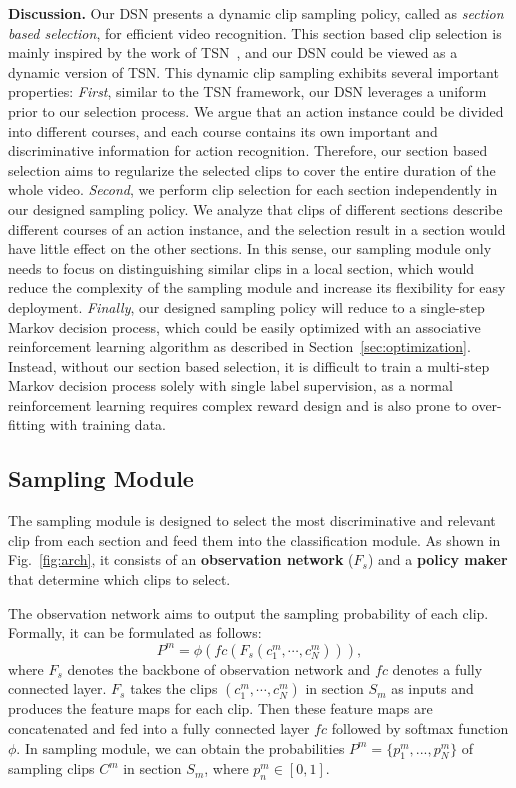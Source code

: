 \documentclass[journal]{IEEEtran}
\begin{document}
{\bf Discussion.} Our DSN presents a dynamic clip sampling policy, called as {\em section based selection}, for efficient video recognition. This section based clip selection is mainly inspired by the work of TSN~\cite{TSN-J}, and our DSN could be viewed as a dynamic version of TSN. This dynamic clip sampling exhibits several important properties: {\em First}, similar to the TSN framework, our DSN leverages a uniform prior to our selection process. We argue that an action instance could be divided into different courses, and each course contains its own important and discriminative information for action recognition. Therefore, our section based selection aims to regularize the selected clips to cover the entire duration of the whole video. {\em Second}, we perform clip selection for each section independently in our designed sampling policy. We analyze that clips of different sections describe different courses of an action instance, and the selection result in a section would have little effect on the other sections. In this sense, our sampling module only needs to focus on distinguishing similar clips in a local section, which would reduce the complexity of the sampling module and increase its flexibility for easy deployment. {\em Finally}, our designed sampling policy will reduce to a single-step Markov decision process, which could be easily optimized with an associative reinforcement learning algorithm as described in Section~\ref{sec:optimization}. Instead, without our section based selection, it is difficult to train a multi-step Markov decision process solely with single label supervision, as a normal reinforcement learning requires complex reward design and is also prone to over-fitting with training data.
\subsection{Sampling Module}
\label{sec:sampling}

The sampling module is designed to select the most discriminative and relevant clip from each section and feed them into the classification module.
As shown in Fig.~\ref{fig:arch}, it consists of an {\bf observation network} ($F_s$) and a {\bf policy maker} that determine which clips to select.

The observation network aims to output the sampling probability of each clip.
Formally, it can be formulated as follows:
\begin{equation}
P^m = \phi (fc(F_s(c^m_1,\cdots,c^m_N))),
\label{equ:sampling}
\end{equation}
where $F_s$ denotes the backbone of observation network and $fc$ denotes a fully connected layer.
$F_s$ takes the clips $(c^m_1,\cdots,c^m_N)$ in section $S_m$ as inputs and produces the feature maps for each clip.
Then these feature maps are concatenated and fed into a fully connected layer $fc$ followed by softmax function $\phi$.
In sampling module, we can obtain the probabilities $P^m=\{p^m_1,...,p^m_N\}$ of sampling clips $C^m$ in section $S_m$, where $p^m_n\in[0,1]$.
\end{document}
